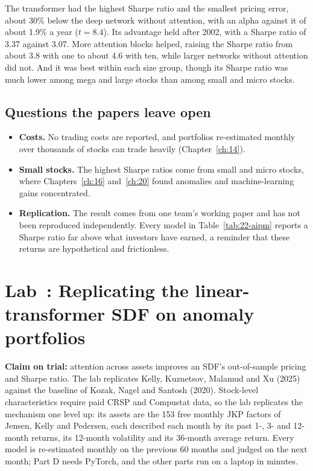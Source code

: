 The transformer had the highest Sharpe ratio and the smallest pricing error, about 30\% below the deep network without attention, with an alpha against it of about 1.9\% a year ($t = 8.4$). Its advantage held after 2002, with a Sharpe ratio of 3.37 against 3.07. More attention blocks helped, raising the Sharpe ratio from about 3.8 with one to about 4.6 with ten, while larger networks without attention did not. And it was best within each size group, though its Sharpe ratio was much lower among mega and large stocks than among small and micro stocks.

\subsection{Questions the papers leave open}

\begin{itemize}
  \item \textbf{Costs.} No trading costs are reported, and portfolios re-estimated monthly over thousands of stocks can trade heavily (Chapter~\ref{ch:14}).
  \item \textbf{Small stocks.} The highest Sharpe ratios come from small and micro stocks, where Chapters~\ref{ch:16} and~\ref{ch:20} found anomalies and machine-learning gains concentrated.
  \item \textbf{Replication.} The result comes from one team's working paper and has not been reproduced independently. Every model in Table~\ref{tab:22-aipm} reports a Sharpe ratio far above what investors have earned, a reminder that these returns are hypothetical and frictionless.
\end{itemize}

\section{Lab~\thechapter: Replicating the linear-transformer SDF on anomaly portfolios}
\label{sec:22-lab}

\textbf{Claim on trial:} attention across assets improves an SDF's out-of-sample pricing and Sharpe ratio. The lab replicates Kelly, Kuznetsov, Malamud and Xu (2025) against the baseline of Kozak, Nagel and Santosh (2020). Stock-level characteristics require paid CRSP and Compustat data, so the lab replicates the mechanism one level up: its assets are the 153 free monthly JKP factors of Jensen, Kelly and Pedersen, each described each month by its past 1-, 3- and 12-month returns, its 12-month volatility and its 36-month average return. Every model is re-estimated monthly on the previous 60 months and judged on the next month; Part D needs PyTorch, and the other parts run on a laptop in minutes.

